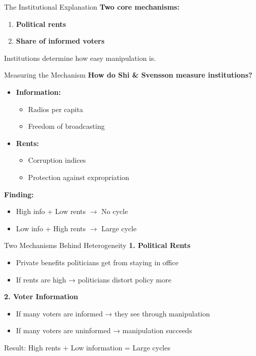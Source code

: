 \documentclass[10pt]{beamer}
\begin{document}
\begin{frame}{The Institutional Explanation}
\textbf{Two core mechanisms:}

\begin{enumerate}
\item \textbf{Political rents}
\item \textbf{Share of informed voters}
\end{enumerate}

\vspace{0.4cm}
\alert{Institutions determine how easy manipulation is.}
\end{frame}

\begin{frame}{Measuring the Mechanism}
\textbf{How do Shi \& Svensson measure institutions?}

\begin{itemize}
\item \textbf{Information:}
\begin{itemize}
\item Radios per capita
\item Freedom of broadcasting
\end{itemize}

\item \textbf{Rents:}
\begin{itemize}
\item Corruption indices
\item Protection against expropriation
\end{itemize}
\end{itemize}

\vspace{0.4cm}
\textbf{Finding:}
\begin{itemize}
\item High info + Low rents $\rightarrow$ No cycle
\item Low info + High rents $\rightarrow$ Large cycle
\end{itemize}
\end{frame}

\begin{frame}{Two Mechanisms Behind Heterogeneity}
\textbf{1. Political Rents}
\begin{itemize}
\item Private benefits politicians get from staying in office
\item If rents are high → politicians distort policy more
\end{itemize}

\vspace{0.3cm}
\textbf{2. Voter Information}
\begin{itemize}
\item If many voters are informed → they see through manipulation
\item If many voters are uninformed → manipulation succeeds
\end{itemize}

\vspace{0.3cm}
\alert{Result:} High rents + Low information = Large cycles
\end{frame}
\end{document}
